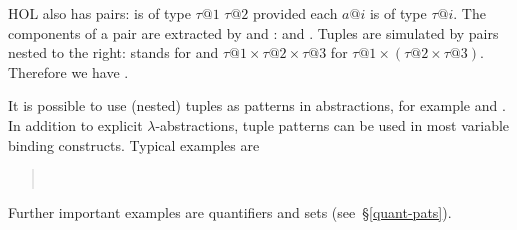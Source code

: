 %
\begin{isabellebody}%
\def\isabellecontext{pairs}%
%
\begin{isamarkuptext}%
HOL also has pairs:  is of type $\tau@1$
 $\tau@2$ provided each $a@i$ is of type
$\tau@i$. The components of a pair are extracted by  and
:  and . Tuples
are simulated by pairs nested to the right:  stands
for  and $\tau@1 \times \tau@2 \times \tau@3$ for
$\tau@1 \times (\tau@2 \times \tau@3)$. Therefore we have
.

It is possible to use (nested) tuples as patterns in abstractions, for
example  and
.
In addition to explicit $\lambda$-abstractions, tuple patterns can be used in
most variable binding constructs. Typical examples are
\begin{quote}
\\
\end{quote}
Further important examples are quantifiers and sets (see~\S\ref{quant-pats}).%
\end{isamarkuptext}%
\end{isabellebody}%
